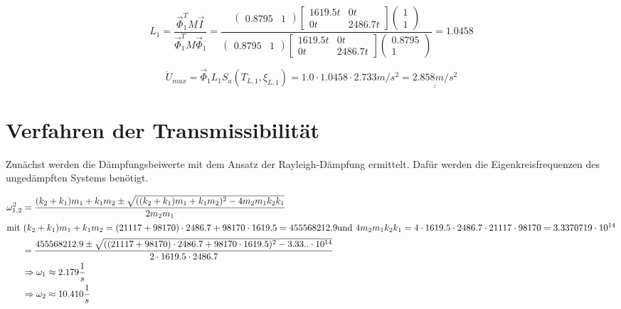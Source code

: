 \begin{equation*}
L_1 = \frac{\vec{\Phi}_1^T M \vec{I}}{\vec{\Phi}_1^T M \vec{\Phi}_1} = \frac{
\begin{pmatrix}
  0.8795 & 1
\end{pmatrix}
\begin{bmatrix}
  1619.5 t & 0 t\\
  0 t & 2486.7 t
\end{bmatrix}
\begin{pmatrix}
  1\\
  1
\end{pmatrix}
}{
\begin{pmatrix}
  0.8795 & 1
\end{pmatrix}
\begin{bmatrix}
  1619.5 t & 0 t\\
  0 t & 2486.7 t
\end{bmatrix}
\begin{pmatrix}
  0.8795 \\
  1
\end{pmatrix}}
= 1.0458
\end{equation*}

\begin{equation*}
\ddot U_{max} = \vec{\Phi}_1 L_1 S_a(T_{L,1}, \xi_{L,1}) = 1.0 \cdot 1.0458 \cdot 2.733 m/s^2 = \underline{\underline{2.858 m/s^2}}
\end{equation*}

\pagebreak

\section{Verfahren der Transmissibilität}

Zunächst werden die Dämpfungsbeiwerte mit dem Ansatz der Rayleigh-Dämpfung ermittelt. Dafür werden die Eigenkreisfrequenzen des ungedämpften Systems benötigt.

\begin{align*}
\omega_{1,2}^2 &= \frac{(k_2 + k_1) m_1 + k_1 m_2 \pm \sqrt{((k_2 + k_1) m_1 + k_1 m_2)^2 - 4 m_2 m_1 k_2 k_1}}{2 m_2 m_1}\\
               \intertext{mit $(k_2 + k_1) m_1 + k_1 m_2 = (21117  + 98170 ) \cdot 2486.7  + 98170  \cdot 1619.5 = 455568212.9 $ \newline und $4 m_2 m_1 k_2 k_1 = 4 \cdot 1619.5  \cdot 2486.7  \cdot 21117  \cdot 98170 = 3.3370719 \cdot 10^{14}$}
               &= \frac{ 455568212.9 \pm \sqrt{((21117  + 98170 ) \cdot 2486.7  + 98170  \cdot 1619.5 )^2 - 3.33.. \cdot 10^{14}}}{2 \cdot 1619.5  \cdot 2486.7 }\\
               &\Rightarrow \omega_1 \approx 2.179 \frac{1}{s}\\
               &\Rightarrow \omega_2 \approx 10.410 \frac{1}{s}
\end{align*}

